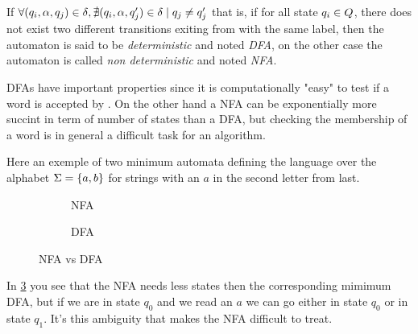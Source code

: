 If $\forall (q_i, \alpha, q_j) \in \delta{}, \nexists (q_i, \alpha, q_j') \in \delta{} \mid q_j \neq q_j'$ that is, if for all state $q_i \in Q{}$, there does not exist two different transitions exiting from \qi{} with the same label, then the automaton is said to be \textit{deterministic} and noted \textit{DFA}, on the other case the automaton is called \textit{non deterministic} and noted \textit{NFA}.

DFAs \automaton{} have important properties since it is computationally "easy" to test if a word is accepted by \automaton{}. On the other hand a NFA can be exponentially more succint in term of number of states than a DFA, but checking the membership of a word is in general a difficult task for an algorithm.

\begin{exmp}
  Here an exemple of two minimum automata defining the language over the alphabet $\Sigma{} = \{a, b\}$ for strings with an $a$ in the second letter from last.
  \begin{figure}[H]
    \centering
    \begin{subfigure}[b]{0.45\textwidth}
      \centering
      \caption{NFA}
      \label{subfig:nfa_x_star_ax}
    \end{subfigure}
    \begin{subfigure}[b]{0.45\textwidth}
      \centering
      \caption{DFA}
      \label{subfig:dfa_x_star_ax}
    \end{subfigure}
    \caption{NFA vs DFA}
    \label{fig:nfa_vs_dfa}
  \end{figure}
  In \cref{fig:nfa_vs_dfa} you see that the NFA needs less states then the corresponding mimimum DFA, but if we are in state $q_0$ and we read an $a$ we can go either in state $q_0$ or in state $q_1$. It's this ambiguity that makes the NFA difficult to treat.
\end{exmp}

